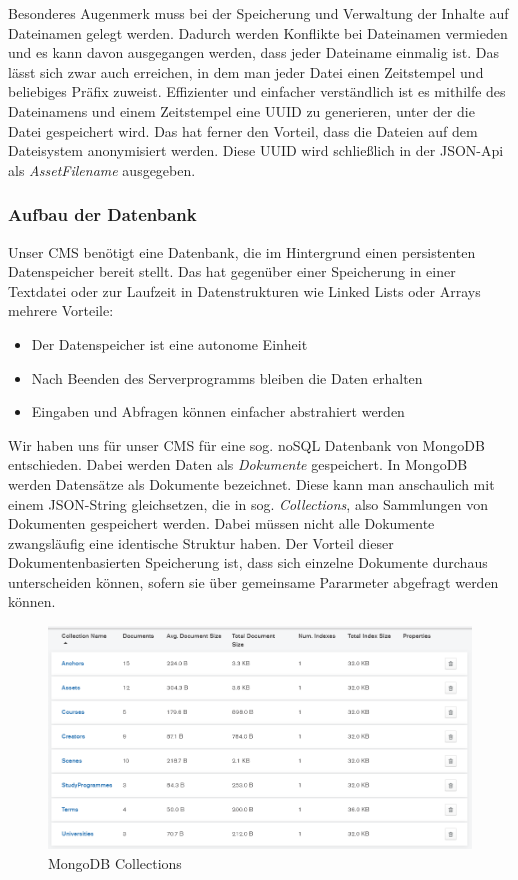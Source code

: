 \documentclass[titlepage, a4paper, 11pt]{scrartcl}
\begin{document}
        Besonderes Augenmerk muss bei der Speicherung und Verwaltung der Inhalte auf Dateinamen gelegt werden. Dadurch werden Konflikte bei Dateinamen vermieden und es kann
        davon ausgegangen werden, dass jeder Dateiname einmalig ist. Das lässt sich zwar auch erreichen, in dem man jeder Datei einen Zeitstempel und beliebiges Präfix zuweist.
        Effizienter und einfacher verständlich ist es mithilfe des Dateinamens und einem Zeitstempel eine UUID zu generieren, unter der die Datei gespeichert wird.
        Das hat ferner den Vorteil, dass die Dateien auf dem Dateisystem anonymisiert werden. Diese UUID wird schließlich in der JSON-Api als \textit{AssetFilename} ausgegeben.       

      \subsubsection{Aufbau der Datenbank}

        Unser CMS benötigt eine Datenbank, die im Hintergrund einen persistenten Datenspeicher bereit stellt.
        Das hat gegenüber einer Speicherung in einer Textdatei oder zur Laufzeit in Datenstrukturen wie Linked Lists oder Arrays mehrere Vorteile:

        \begin{itemize}
          \item Der Datenspeicher ist eine autonome Einheit
          \item Nach Beenden des Serverprogramms bleiben die Daten erhalten
          \item Eingaben und Abfragen können einfacher abstrahiert werden
        \end{itemize}

        Wir haben uns für unser CMS für eine sog. noSQL Datenbank von MongoDB entschieden. Dabei werden Daten als \textit{Dokumente} gespeichert. 
        In MongoDB werden Datensätze als Dokumente bezeichnet. Diese kann man anschaulich mit einem JSON-String gleichsetzen, die in sog. \textit{Collections},
        also Sammlungen von Dokumenten gespeichert werden. Dabei müssen nicht alle Dokumente zwangsläufig eine identische Struktur haben.
        Der Vorteil dieser Dokumentenbasierten Speicherung ist, dass sich einzelne Dokumente durchaus unterscheiden können, sofern sie über gemeinsame Pararmeter abgefragt werden können.

        \begin{figure}[h]
          \centering
          \includegraphics[width=.6\textwidth]{MongoDB.PNG}
          \caption{MongoDB Collections}
          \label{MongoCollection}
        \end{figure}
\end{document}
